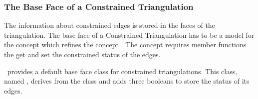 \subsubsection{The Base Face of a Constrained Triangulation}
 The information about constrained edges is stored in the 
faces of the triangulation. The base face of a Constrained Triangulation
has to be a model for the concept 
which refines the concept .
The concept 
requires  member functions
 the get and set the constrained status of the edges.

\cgal\ provides a default base face class
for constrained triangulations. This class, named
,
derives from the class
and adds three booleans to store the status of its edges. 


